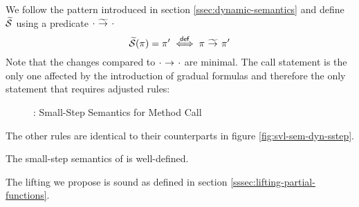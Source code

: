 We follow the pattern introduced in section \ref{ssec:dynamic-semantics} and define $\widetilde{\mathcal{S}}$ using a predicate ${\cdot} \,\,{\widetilde{\rightarrow}^{}}\,\, {\cdot}$
\begin{displaymath}
\widetilde{\mathcal{S}}(\pi) = \pi' \overset{\textup{\textsf{def}}}{\iff} {\pi} \,\,{\widetilde{\rightarrow}^{}}\,\, {\pi'}
\end{displaymath}
Note that the changes compared to ${\cdot} \,\,{\rightarrow^{}}\,\, {\cdot}$ are minimal.
The call statement is the only one affected by the introduction of gradual formulas and therefore the only statement that requires adjusted rules:
\begin{figure}
    \boxed{\gsstep{\pi}{\pi}}
    
    \caption{\gvlidf: Small-Step Semantics for Method Call}
    \label{fig:gvl-sem-dyn-sstep}
\end{figure}

The other rules are identical to their counterparts in figure \ref{fig:svl-sem-dyn-sstep}.

\begin{lemma}
    The small-step semantics of \gvlidf is well-defined.
\end{lemma}

\begin{lemma}
    The lifting we propose is sound as defined in section \ref{sssec:lifting-partial-functions}.
\end{lemma}